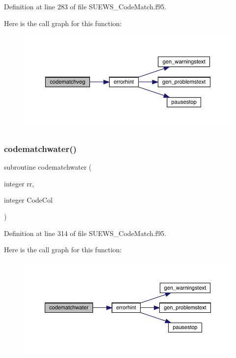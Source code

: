 Definition at line 283 of file S\+U\+E\+W\+S\+\_\+\+Code\+Match.\+f95.

Here is the call graph for this function\+:\nopagebreak
\begin{figure}[H]
\begin{center}
\leavevmode
\includegraphics[width=350pt]{_s_u_e_w_s___code_match_8f95_ac0f963de4bead7bb4cd003951e8b3592_cgraph}
\end{center}
\end{figure}
\mbox{\label{_s_u_e_w_s___code_match_8f95_a2b4b50652851ddf7481abfb1e983f637}} 
\subsubsection{\texorpdfstring{codematchwater()}{codematchwater()}}
{\footnotesize\ttfamily subroutine codematchwater (\begin{DoxyParamCaption}\item[{integer}]{rr,  }\item[{integer}]{Code\+Col }\end{DoxyParamCaption})}



Definition at line 314 of file S\+U\+E\+W\+S\+\_\+\+Code\+Match.\+f95.

Here is the call graph for this function\+:\nopagebreak
\begin{figure}[H]
\begin{center}
\leavevmode
\includegraphics[width=350pt]{_s_u_e_w_s___code_match_8f95_a2b4b50652851ddf7481abfb1e983f637_cgraph}
\end{center}
\end{figure}
